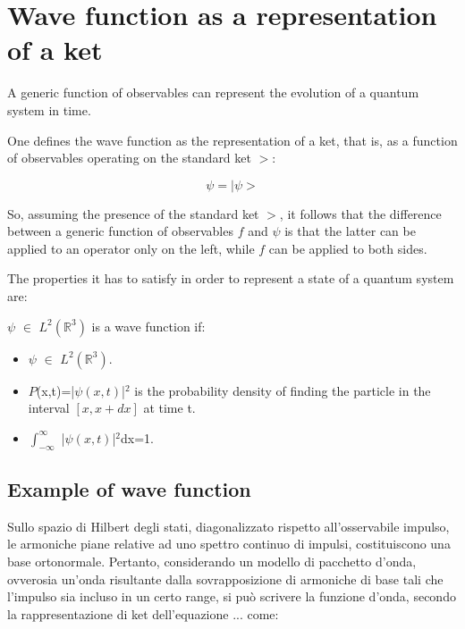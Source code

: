 \documentclass{article}
\begin{document}
\section{Wave function as a representation of a ket}

A generic function of observables can represent the evolution of a quantum system in time.

One defines the wave function as the representation of a ket, that is, as a function of observables operating on the standard ket $>$:

\begin{equation}
    \psi = |\psi>
\end{equation}

So, assuming the presence of the standard ket $>$, it follows that the difference between a generic function of observables $f$ and $\psi$ is that
the latter can be applied to an operator only on the left, while $f$ can be applied to both sides.

The properties it has to satisfy in order to represent a state of a quantum system are:

\begin{tcolorbox}[colframe=gray!90, colback=blue!5, coltitle=white, title=\textbf{Definition: Wave Function}, fonttitle=\large\bfseries]
    $\psi$ $\in$ $L^2(\mathbb{R}^3)$ is a wave function if:
    \begin{itemize}
        \item $\psi$ $\in$ $L^2(\mathbb{R}^3)$.
        \item $P$(x,t)=|$\psi(x,t)$|$^2$ is the probability density of finding the particle in the interval $[x,x+dx]$ at time t.
        \item $\int_{-\infty}^{\infty}$ |$\psi(x,t)$|$^2$dx=1.
    \end{itemize}
\end{tcolorbox}


\subsection{Example of wave function}
Sullo spazio di Hilbert degli stati, diagonalizzato rispetto all'osservabile impulso, le armoniche piane relative ad uno spettro continuo di impulsi, costituiscono una base ortonormale.
Pertanto, considerando un modello di pacchetto d'onda, ovverosia un'onda risultante dalla sovrapposizione di armoniche di base tali che l'impulso sia incluso in
un certo range, si può scrivere la funzione d'onda, secondo la rappresentazione di ket dell'equazione ... come:
\end{document}
